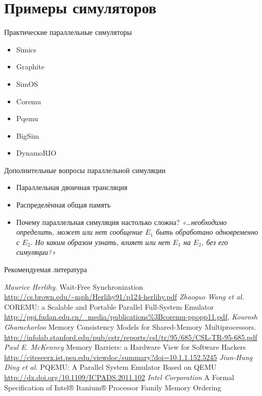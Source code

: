 \documentclass{beamer}
\begin{document}
\section{Примеры симуляторов}

\begin{frame}{Практические параллельные симуляторы}
\begin{itemize}
    \item Simics
    \item Graphite
    \item SimOS
    \item Coremu
    \item Pqemu
    \item BigSim
    \item DynamoRIO
\end{itemize}
\end{frame}

\begin{frame}{Дополнительные вопросы параллельной симуляции}
\begin{itemize}
	\item Параллельная двоичная трансляция
	\item Распределённая общая память \pause
	\item Почему параллельная симуляция настолько сложна? \pause \textit{«\dots необходимо определить, может или нет сообщение $E_1$ быть обработано одновременно с $E_2$. Но каким образом узнать, влияет или нет $E_1$ на $E_2$, без его симуляции?»}
\end{itemize}    
\end{frame}

\begin{frame}[allowframebreaks]{Рекомендуемая литература}
\begin{thebibliography}{99}
     \textit{Maurice Herlihy}. Wait-Free Synchronization \url{http://cs.brown.edu/~mph/Herlihy91/p124-herlihy.pdf}
     \textit{Zhaoguo Wang et al.} COREMU: a Scalable and Portable Parallel Full-System Emulator \url{http://ppi.fudan.edu.cn/_media/publications\%3Bcoremu-ppopp11.pdf},
     \textit{Kourosh Gharachorloo} Memory Consistency Models for Shared-Memory Multiprocessors. \url{http://infolab.stanford.edu/pub/cstr/reports/csl/tr/95/685/CSL-TR-95-685.pdf}
     \textit{Paul E. McKenney} Memory Barriers: a Hardware View for Software Hackers \url{http://citeseerx.ist.psu.edu/viewdoc/summary?doi=10.1.1.152.5245}
     \textit{Jiun-Hung Ding et al.} PQEMU: A Parallel System Emulator Based on QEMU \url{http://dx.doi.org/10.1109/ICPADS.2011.102}
     \textit{Intel Corporation} A Formal Specification of {Intel}® {Itanium}® Processor Family Memory Ordering
\end{thebibliography}
\end{frame}
\end{document}

